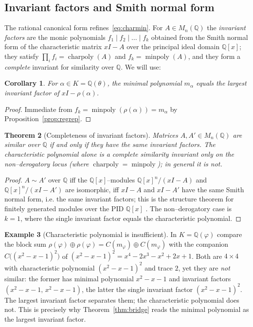 \documentclass[11pt]{article}
\theoremstyle{plain}
\newtheorem{theorem}{Theorem}[section]
\newtheorem{corollary}[theorem]{Corollary}
\theoremstyle{definition}
\newtheorem{example}[theorem]{Example}
\theoremstyle{remark}
\newcommand{\Q}{\mathbb{Q}}
\newcommand{\K}{K}
\newcommand{\charpoly}{\operatorname{charpoly}}
\newcommand{\minpoly}{\operatorname{minpoly}}
\begin{document}
\subsection{Invariant factors and Smith normal form}
The rational canonical form refines~\eqref{eq:charmin}. For $A\in M_n(\Q)$ the \emph{invariant factors} are
the monic polynomials $f_1\mid f_2\mid\dots\mid f_k$ obtained from the Smith normal form of the
characteristic matrix $xI-A$ over the principal ideal domain $\Q[x]$; they satisfy $\prod_i f_i=\charpoly(A)$
and $f_k=\minpoly(A)$, and they form a \emph{complete} invariant for similarity over $\Q$. We will use:

\begin{corollary}\label{cor:largestif}
For $\alpha\in\K=\Q(\theta)$, the minimal polynomial $m_\alpha$ equals the largest invariant factor of
$xI-\rho(\alpha)$.
\end{corollary}
\begin{proof}
Immediate from $f_k=\minpoly(\rho(\alpha))=m_\alpha$ by Proposition~\ref{prop:regrep}.
\end{proof}
\begin{theorem}[Completeness of invariant factors]\label{thm:ifcomplete}
Matrices $A,A'\in M_n(\Q)$ are similar over $\Q$ if and only if they have the same invariant factors. The
characteristic polynomial alone is a complete similarity invariant only on the non--derogatory locus (where
$\charpoly=\minpoly$); in general it is not.
\end{theorem}
\begin{proof}
$A\sim A'$ over $\Q$ iff the $\Q[x]$--modules $\Q[x]^n/(xI-A)$ and $\Q[x]^n/(xI-A')$ are isomorphic, iff
$xI-A$ and $xI-A'$ have the same Smith normal form, i.e. the same invariant factors; this is the structure
theorem for finitely generated modules over the PID $\Q[x]$ \cite[Ch.~12]{DummitFoote}. The non--derogatory
case is $k=1$, where the single invariant factor equals the characteristic polynomial.
\end{proof}

\begin{example}[Characteristic polynomial is insufficient]\label{ex:phiphi}
In $\K=\Q(\varphi)$ compare the block sum $\rho(\varphi)\oplus\rho(\varphi)=C(m_\varphi)\oplus C(m_\varphi)$
with the companion $C\big((x^2-x-1)^2\big)$ of $(x^2-x-1)^2=x^4-2x^3-x^2+2x+1$. Both are $4\times4$ with
characteristic polynomial $(x^2-x-1)^2$ and trace $2$, yet they are \emph{not} similar: the former has
minimal polynomial $x^2-x-1$ and invariant factors $(x^2-x-1,\,x^2-x-1)$, the latter the single invariant
factor $(x^2-x-1)^2$. The largest invariant factor separates them; the characteristic polynomial does not.
This is precisely why Theorem~\ref{thm:bridge} reads the minimal polynomial as the largest invariant factor.
\end{example}
\end{document}
